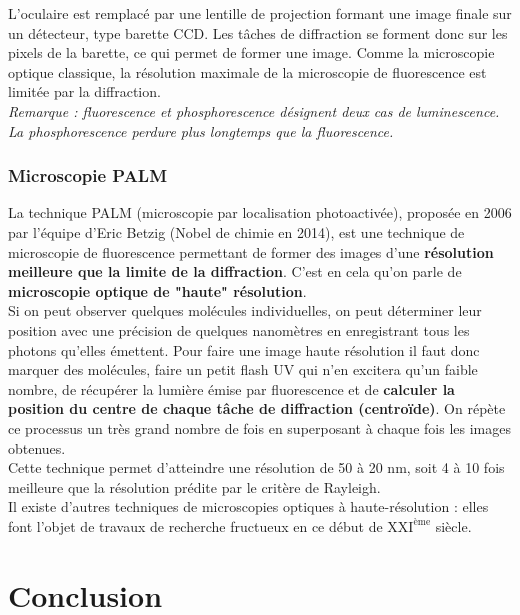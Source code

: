 \documentclass[11pt,a4paper]{report}
\begin{document}
L'oculaire est remplacé par une lentille de projection formant une image finale sur un détecteur, type barette CCD. Les tâches de diffraction se forment donc sur les pixels de la barette, ce qui permet de former une image. Comme la microscopie optique classique, la résolution maximale de la microscopie de fluorescence est limitée par la diffraction.\\

\textit{Remarque : fluorescence et phosphorescence désignent deux cas de luminescence. La phosphorescence perdure plus longtemps que la fluorescence.}

\subsubsection{Microscopie PALM}

La technique PALM (microscopie par localisation photoactivée), proposée en 2006 par l'équipe d'Eric Betzig (Nobel de chimie en 2014), est une technique de microscopie de fluorescence permettant de former des images d'une \textbf{résolution meilleure que la limite de la diffraction}. C'est en cela qu'on parle de \textbf{microscopie optique de "haute" résolution}.\\

Si on peut observer quelques molécules individuelles, on peut déterminer leur position avec une précision de quelques nanomètres en enregistrant tous les photons qu'elles émettent.
Pour faire une image haute résolution il faut donc marquer des molécules, faire un petit flash UV qui n'en excitera qu'un faible nombre, de récupérer la lumière émise par fluorescence et de \textbf{calculer la position du centre de chaque tâche de diffraction (centroïde)}. On répète ce processus un très grand nombre de fois en superposant à chaque fois les images obtenues.\\

Cette technique permet d'atteindre une résolution de 50 à 20 nm, soit 4 à 10 fois meilleure que la résolution prédite par le critère de Rayleigh.\\

Il existe d'autres techniques de microscopies optiques à haute-résolution : elles font l'objet de travaux de recherche fructueux en ce début de $\text{XXI}^\text{ème}$ siècle.

\section*{Conclusion}
\end{document}
